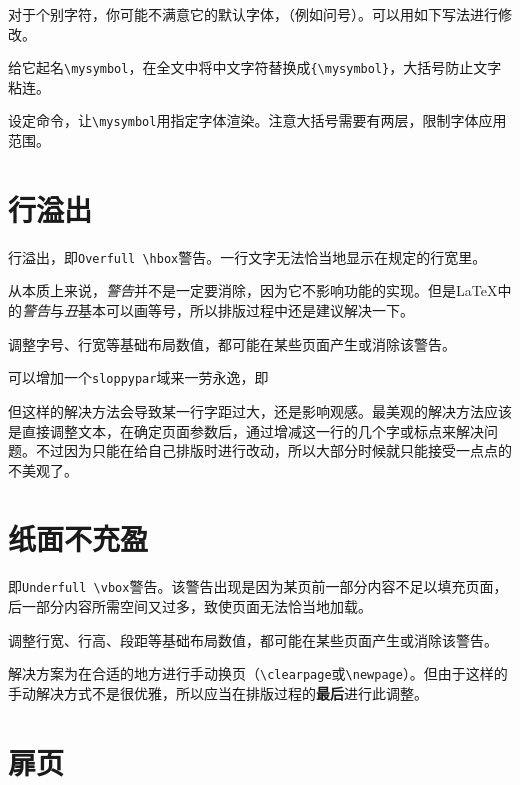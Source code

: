 \documentclass[10pt,openany]{book}
\begin{document}
对于个别字符，你可能不满意它的默认字体，（例如问号）。可以用如下写法进行修改。

给它起名\texttt{\textbackslash{}mysymbol}，在全文中将中文字符替换成\texttt{\{\textbackslash{}mysymbol\}}，大括号防止文字粘连。

设定命令，让\texttt{\textbackslash{}mysymbol}用指定字体渲染。注意大括号需要有两层，限制字体应用范围。



\section{行溢出}

行溢出，即\texttt{Overfull\ \textbackslash{}hbox}警告。一行文字无法恰当地显示在规定的行宽里。

从本质上来说，\textit{警告}并不是一定要消除，因为它不影响功能的实现。但是\LaTeX 中的\textit{警告}与\textit{丑}基本可以画等号，所以排版过程中还是建议解决一下。

调整字号、行宽等基础布局数值，都可能在某些页面产生或消除该警告。

可以增加一个\texttt{sloppypar}域来一劳永逸，即



但这样的解决方法会导致某一行字距过大，还是影响观感。最美观的解决方法应该是直接调整文本，在确定页面参数后，通过增减这一行的几个字或标点来解决问题。不过因为只能在给自己排版时进行改动，所以大部分时候就只能接受一点点的不美观了。

\section{纸面不充盈}

即\texttt{Underfull\ \textbackslash{}vbox}警告。该警告出现是因为某页前一部分内容不足以填充页面，后一部分内容所需空间又过多，致使页面无法恰当地加载。

调整行宽、行高、段距等基础布局数值，都可能在某些页面产生或消除该警告。

解决方案为在合适的地方进行手动换页（\texttt{\textbackslash{}clearpage}或\texttt{\textbackslash{}newpage}）。但由于这样的手动解决方式不是很优雅，所以应当在排版过程的\textbf{最后}进行此调整。

\section{扉页}
\end{document}

